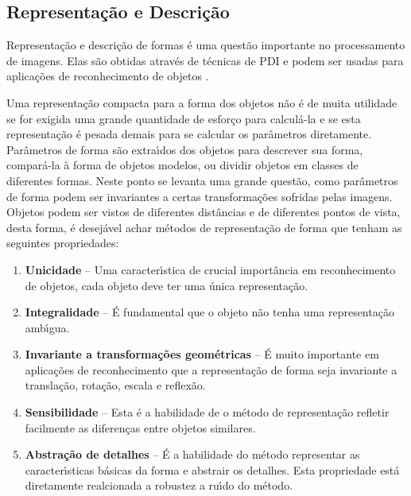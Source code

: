 \subsection{Representa\c{c}\~{a}o e Descri\c{c}\~{a}o}

Representa\c{c}\~{a}o e descri\c{c}\~{a}o de formas \'{e} uma quest\~{a}o importante no processamento de imagens. Elas s\~{a}o obtidas atrav\'{e}s de t\'{e}cnicas de \ac{PDI} e podem ser usadas para aplica\c{c}\~{o}es de reconhecimento de objetos \cite{PITAS:2000}.

Uma representa\c{c}\~{a}o compacta para a forma dos objetos n\~{a}o \'{e} de muita utilidade se for exigida uma grande quantidade de esfor\c{c}o para calcul\'{a}-la e se esta representa\c{c}\~{a}o \'{e} pesada demais para se calcular os par\^{a}metros diretamente. Par\^{a}metros de forma s\~{a}o extra\'{\i}dos dos objetos para descrever sua forma, compar\'{a}-la \`{a} forma de objetos modelos, ou dividir objetos em classes de diferentes formas. Neste ponto se levanta uma grande quest\~{a}o, como par\^{a}metros de forma podem ser invariantes a certas transforma\c{c}\~{o}es sofridas pelas imagens. Objetos podem ser vistos de diferentes dist\^{a}ncias e de diferentes pontos de vista, desta forma, \'{e} desej\'{a}vel achar m\'{e}todos de representa\c{c}\~{a}o de forma que tenham as seguintes propriedades\cite{JAHNE:2005}\cite{PITAS:2000}: \\

\begin{enumerate}
    \item \textbf{Unicidade} -- Uma caracter\'{\i}stica de crucial import\^{a}ncia em reconhecimento de objetos, cada objeto deve ter uma \'{u}nica representa\c{c}\~{a}o.
    \item \textbf{Integralidade} -- \'{E} fundamental que o objeto n\~{a}o tenha uma representa\c{c}\~{a}o amb\'{\i}gua.
    \item \textbf{Invariante a transforma\c{c}\~{o}es geom\'{e}tricas} -- \'{E} muito importante em aplica\c{c}\~{o}es de reconhecimento que a representa\c{c}\~{a}o de forma seja invariante a transla\c{c}\~{a}o, rota\c{c}\~{a}o, escala e reflex\~{a}o.
    \item \textbf{Sensibilidade} -- Esta \'{e} a habilidade de o m\'{e}todo de representa\c{c}\~{a}o refletir facilmente as diferen\c{c}as entre objetos similares.
    \item \textbf{Abstra\c{c}\~{a}o de detalhes} -- \'{E} a habilidade do m\'{e}todo representar as caracter\'{\i}sticas b\'{a}sicas da forma e abstrair os detalhes. Esta propriedade est\'{a} diretamente realcionada a robustez a ru\'{\i}do do m\'{e}todo.
\end{enumerate}

